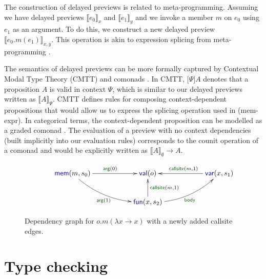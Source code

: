 \documentclass[english,submission]{programming}
\theoremstyle{plain}
\theoremstyle{definition}
\newcommand{\bnd}[1]{\textnormal{\textcolor{kvdclr}{\sffamily #1}}}
\newcommand{\blbl}[1]{\textnormal{\textcolor{numclr}{\sffamily #1}}}
\newcommand{\rname}[1]{{\sffamily(#1)}}
\begin{document}
The construction of delayed previews is related to meta-programming. Assuming
we have delayed previews $\llbracket e_0 \rrbracket_x$ and $\llbracket e_1 \rrbracket_y$ and
we invoke a member $m$ on $e_0$ using $e_1$ as an argument. To do this, we construct a new
delayed preview $\llbracket e_0.m(e_1) \rrbracket_{x, y}$. This operation is akin to expression
splicing from meta-programming \cite{metaml,quotations}.

The semantics of delayed previews can be more formally captured by Contextual Modal Type Theory
(CMTT) \cite{cmtt} and comonads \cite{cmtt-denotation}. In CMTT, $\lbrack \Psi \rbrack A$ denotes
that a proposition $A$ is valid in context $\Psi$, which is similar to our delayed previews written
as $\llbracket A \rrbracket_\Psi$. CMTT defines rules for composing context-dependent propositions
that would allow us to express the splicing operation used in \rname{mem-expr}. In categorical
terms, the context-dependent proposition can be modelled as a graded comonad \cite{effectrev,graded}.
The evaluation of a preview with no context dependencies (built implicitly into our evaluation rules)
corresponds to the counit operation of a comonad and would be explicitly written as
$\llbracket A \rrbracket_\emptyset \rightarrow A$.


\begin{figure}
\vspace{-0.5em}
\begin{equation*}
\hspace{3em}
\xymatrix{
\bnd{mem}(m, s_0) \ar@/_1pc/[drr]_{\blbl{arg}(1)} \ar[rr]^{\blbl{arg}(0)} && \bnd{val}(o) && \bnd{var}(x, s_1)\ar[ll]_{\blbl{callsite}(m, 1)} \\
&&\bnd{fun}(x, s_2) \ar[u]_{\blbl{callsite}(m, 1)} \ar@/_1pc/[rru]_{\blbl{body}} &&
}
\end{equation*}
\vspace{-0.5em}
\caption{Dependency graph for $o.m(\lambda x\rightarrow x)$ with a newly added \blbl{callsite} edges.}
\label{fig:graph-func}
\vspace{-0.5em}
\end{figure}


\section{Type checking}
\label{sec:extra-types}
\end{document}
